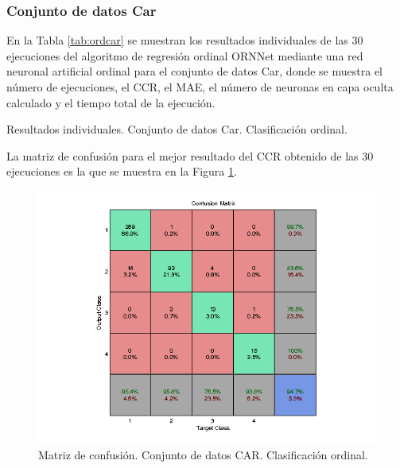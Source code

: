 			\subsubsection{Conjunto de datos Car}
			
			En la Tabla \ref{tab:ordcar} se muestran los resultados individuales de las 30 ejecuciones del algoritmo de regresión ordinal ORNNet mediante una red neuronal artificial ordinal para el conjunto de datos Car, donde se muestra el número de ejecuciones, el CCR, el MAE, el número de neuronas en capa oculta calculado y el tiempo total de la ejecución.\\
			
			\begin{table}[!htbp]
				\centering
				\caption{Resultados individuales. Conjunto de datos Car. Clasificación ordinal.}
				\label{tab:ordcar}
			\end{table}
			
			La matriz de confusión para el mejor resultado del CCR obtenido de las 30 ejecuciones es la que se muestra en la Figura \ref{fig:ordcar}.
			
			\begin{figure}[htbp]
				\centering
				\includegraphics[scale=0.8]{../src/results/ordinal/car_mc1.png}
				\caption{Matriz de confusión. Conjunto de datos CAR. Clasificación ordinal.}
				\label{fig:ordcar}
			\end{figure}
			
